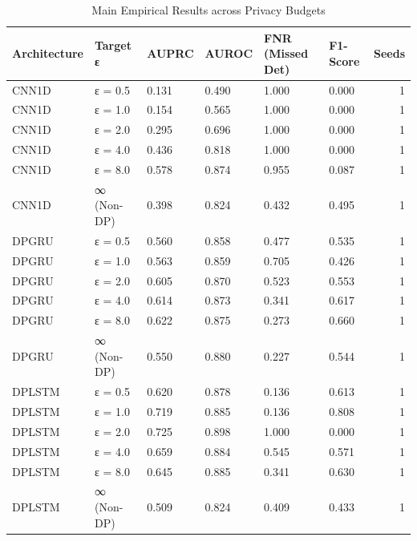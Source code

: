 \begin{table}
\caption{Main Empirical Results across Privacy Budgets}
\label{tab:main_results}
\begin{tabular}{llllllr}
\toprule
Architecture & Target ε & AUPRC & AUROC & FNR (Missed Det) & F1-Score & Seeds \\
\midrule
CNN1D & ε = 0.5 & 0.131 & 0.490 & 1.000 & 0.000 & 1 \\
CNN1D & ε = 1.0 & 0.154 & 0.565 & 1.000 & 0.000 & 1 \\
CNN1D & ε = 2.0 & 0.295 & 0.696 & 1.000 & 0.000 & 1 \\
CNN1D & ε = 4.0 & 0.436 & 0.818 & 1.000 & 0.000 & 1 \\
CNN1D & ε = 8.0 & 0.578 & 0.874 & 0.955 & 0.087 & 1 \\
CNN1D & ∞ (Non-DP) & 0.398 & 0.824 & 0.432 & 0.495 & 1 \\
DPGRU & ε = 0.5 & 0.560 & 0.858 & 0.477 & 0.535 & 1 \\
DPGRU & ε = 1.0 & 0.563 & 0.859 & 0.705 & 0.426 & 1 \\
DPGRU & ε = 2.0 & 0.605 & 0.870 & 0.523 & 0.553 & 1 \\
DPGRU & ε = 4.0 & 0.614 & 0.873 & 0.341 & 0.617 & 1 \\
DPGRU & ε = 8.0 & 0.622 & 0.875 & 0.273 & 0.660 & 1 \\
DPGRU & ∞ (Non-DP) & 0.550 & 0.880 & 0.227 & 0.544 & 1 \\
DPLSTM & ε = 0.5 & 0.620 & 0.878 & 0.136 & 0.613 & 1 \\
DPLSTM & ε = 1.0 & 0.719 & 0.885 & 0.136 & 0.808 & 1 \\
DPLSTM & ε = 2.0 & 0.725 & 0.898 & 1.000 & 0.000 & 1 \\
DPLSTM & ε = 4.0 & 0.659 & 0.884 & 0.545 & 0.571 & 1 \\
DPLSTM & ε = 8.0 & 0.645 & 0.885 & 0.341 & 0.630 & 1 \\
DPLSTM & ∞ (Non-DP) & 0.509 & 0.824 & 0.409 & 0.433 & 1 \\
\bottomrule
\end{tabular}
\end{table}
